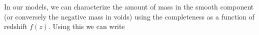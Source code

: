 In our models, we can characterize the amount of mass in the smooth component (or conversely the negative mass in voids)
using the completeness as a function of redshift $f(z)$. Using this we can write
  
  